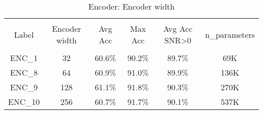 \begin{table}[h!]
\centering
\begin{tabular}{| c  c  c  c  c  c |} 
 \hline \\[-1em]
 Label & Encoder width & Avg Acc & Max Acc & Avg Acc SNR>0 & n\_parameters \\ [1ex]  \\[-1em]
    ENC\_1 & 32 & 60.6\% & 90.2\% & 89.7\% & 69K \\ [1ex]
    ENC\_8 & 64 & 60.9\% & 91.0\% & 89.9\% & 136K \\ [1ex]
    ENC\_9 & 128 & 61.1\% & 91.8\% & 90.3\% & 270K \\ [1ex]
    ENC\_10 & 256 & 60.7\% & 91.7\% & 90.1\% & 537K \\ [1ex]
\hline
\end{tabular}
\caption{Encoder: Encoder width}
\label{table:encoder_width}
\end{table}


